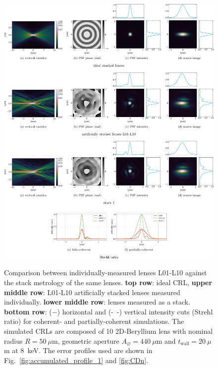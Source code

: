 \begin{refsection}
\begin{figure}[t]
        \centering
        {\includegraphics[width=1\linewidth]{figures/ch05/CDn_vs_CDnStack.pdf}}
        \caption[Artificially stacked lenses L01-L11 vs. stack 1 comparison]{Comparison between individually-measured lenses L01-L10 against the stack metrology of the same lenses. \textbf{top row}: ideal CRL, \textbf{upper middle row}: L01-L10 artificially stacked lenses measured individually. \textbf{lower middle row}: lenses measured as a stack. \textbf{bottom row}: ($-$) horizontal and (-~-) vertical intensity cuts (Strehl ratio) for coherent- and partially-coherent simulations. The simulated CRLs are composed of 10 2D-Beryllium lens with nominal radius $R=50~\mu\text{m}$, geometric aperture $A_{\diameter}=440~\mu\text{m}$ and $t_\text{wall}=20~\mu$m at 8~keV. The error profiles used are shown in Fig.~\ref{fig:accumulated_profile_1} and \ref{fig:CDn}.}\label{fig:CDn_vs_CDnStack}
\end{figure}


\end{refsection}
